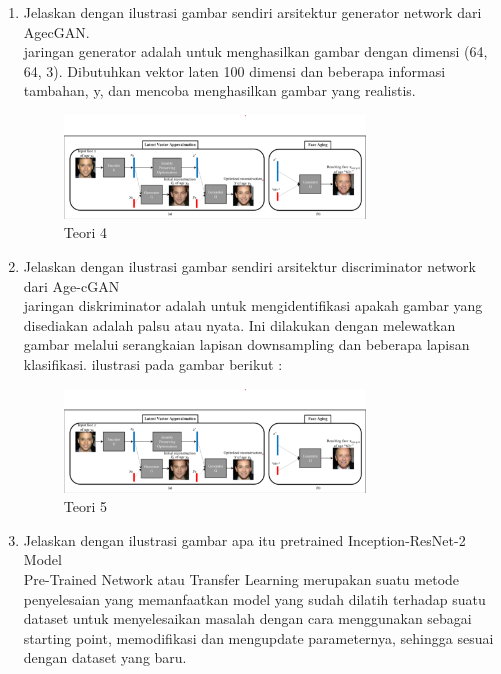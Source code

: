 \begin{enumerate}
\item Jelaskan dengan ilustrasi gambar sendiri arsitektur generator network dari AgecGAN.
\hfill\\
	 jaringan generator adalah untuk menghasilkan gambar dengan dimensi (64, 64, 3). Dibutuhkan vektor laten 100 dimensi dan beberapa informasi tambahan, y, dan mencoba menghasilkan gambar yang realistis.
	
	
\begin{figure}[H]
    \includegraphics[width=8cm]{figures/1174084/9/teori345.png}
    \centering
    \caption{Teori 4}
\end{figure}

\item Jelaskan dengan ilustrasi gambar sendiri arsitektur discriminator network dari Age-cGAN
	\hfill\\
	jaringan diskriminator adalah untuk mengidentifikasi apakah gambar yang disediakan adalah palsu atau nyata. Ini dilakukan dengan melewatkan gambar melalui serangkaian lapisan downsampling dan beberapa lapisan klasifikasi.
	ilustrasi pada gambar berikut :

\begin{figure}[H]
    \includegraphics[width=8cm]{figures/1174084/9/teori345.png}
    \centering
    \caption{Teori 5}
\end{figure}

\item Jelaskan dengan ilustrasi gambar apa itu pretrained Inception-ResNet-2 Model
	\hfill\\
	Pre-Trained Network atau Transfer Learning merupakan suatu metode penyelesaian yang memanfaatkan model yang sudah dilatih terhadap suatu dataset untuk menyelesaikan masalah dengan cara menggunakan sebagai starting point, memodifikasi dan mengupdate parameternya, sehingga sesuai dengan dataset yang baru.
	

\end{enumerate}
